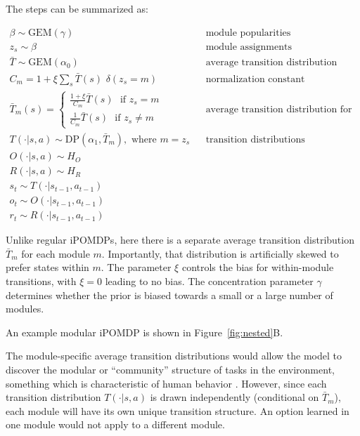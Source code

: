 \documentclass[11pt]{article}
\begin{document}
The steps can be summarized as:

\begin{align*}
\beta \sim \text{GEM}(\gamma)   		&& \text{module popularities} \\
z_s \sim \beta   		&& \text{module assignments} \\
\bar{T} \sim \text{GEM}(\alpha_0)     		&& \text{average transition distribution} \\
C_m =  1 + \xi {\sum_s \bar{T}(s) \,\, \delta(z_s = m) }   		&& \text{normalization constant} \\
\bar{T}_m(s) = \begin{cases} \frac{1 + \xi}{C_m} \bar{T}(s)  \,\, \text{ if }  z_s = m \\  \frac{1}{C_m} \bar{T}(s) \,\, \text{ if } z_s \ne m \end{cases}     		&& \text{average transition distribution for each module} \\ 
T(\cdot | s,a) \sim \text{DP}(\alpha_1, \bar{T}_m), \text{ where } m = z_s 		 && \text{transition distributions}\\
O(\cdot | s,a) \sim H_O \\
R(\cdot | s,a) \sim H_R \\
s_t \sim T(\cdot | s_{t-1},a_{t-1}) \\
o_t \sim O(\cdot | s_{t-1}, a_{t-1}) \\
r_t \sim R(\cdot | s_{t-1}, a_{t-1}) 
\end{align*}

Unlike regular iPOMDPs, here there is a separate average transition distribution $\bar{T}_m$ for each module $m$. Importantly, that distribution is artificially skewed to prefer states within $m$. The parameter $\xi$ controls the bias for within-module transitions, with $\xi = 0$ leading to no bias. The concentration parameter $\gamma$ determines whether the prior is biased towards a small or a large number of modules.

An example modular iPOMDP is shown in Figure~\ref{fig:nested}B.

The module-specific average transition distributions would allow the model to discover the modular or ``community'' structure of tasks in the environment, something which is characteristic of human behavior \cite{Schapiro2013, Solway2014}. However, since each transition distribution $T(\cdot|s,a)$ is drawn independently (conditional on $\bar{T}_m$), each module will have its own unique transition structure. An option learned in one module would not apply to a different module.
\end{document}
